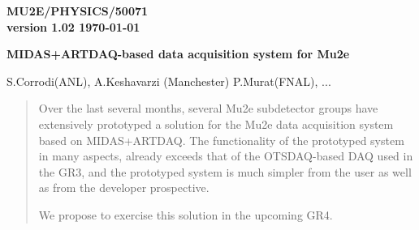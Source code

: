 \documentclass[12pt]{article}
\begin{document}
\begin{titlepage}
  \begin{flushright}
    \bf {MU2E/PHYSICS/50071} \\
    version 1.02
    \today
 \end{flushright}

  \vspace{1cm}

  \begin{center}
    {\Large \bf MIDAS+ARTDAQ-based data acquisition system for Mu2e
      \vspace{0.3in}
    }

    \vspace{1cm}
    S.Corrodi(ANL), A.Keshavarzi (Manchester) P.Murat(FNAL), ...

    \vspace{0.3cm}

    \vspace{0.8cm}
  \end{center}

  \begin{abstract}
    \vspace{0.2in}

    Over the last several months, several Mu2e subdetector groups have extensively
    prototyped a solution for the Mu2e data acquisition system based on MIDAS+ARTDAQ.
%
    The functionality of the prototyped system in many aspects, already exceeds that
    of the OTSDAQ-based DAQ used in the GR3, and the prototyped system is much simpler
    from the user as well as from the developer prospective.
    
    \vspace{0.2in}
    We propose to exercise this solution in the upcoming GR4.
    
  \end{abstract}

\end{titlepage}
%
%
%
{\tableofcontents}

% 
\end{document}
